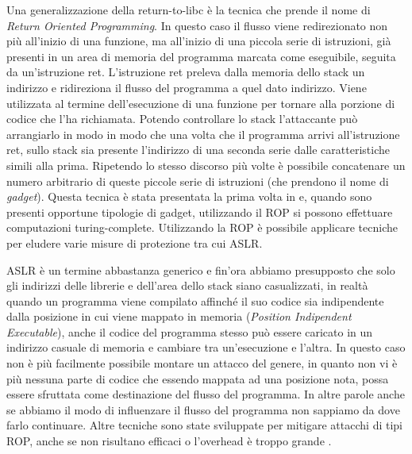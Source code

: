Una generalizzazione della return-to-libc è la tecnica che prende il
nome di \emph{Return Oriented
  Programming}\cite{Shacham-2007,Roemer-2012}. In questo caso il
flusso viene redirezionato non più all'inizio di una funzione, ma
all'inizio di una piccola serie di istruzioni, già presenti in un area
di memoria del programma marcata come eseguibile, seguita da
un'istruzione ret. L'istruzione ret preleva dalla memoria dello stack
un indirizzo e ridireziona il flusso del programma a quel dato
indirizzo. Viene utilizzata al termine dell'esecuzione di una funzione
per tornare alla porzione di codice che l'ha richiamata. Potendo
controllare lo stack l'attaccante può arrangiarlo in modo in modo che
una volta che il programma arrivi all'istruzione ret, sullo stack sia
presente l'indirizzo di una seconda serie dalle caratteristiche simili
alla prima. Ripetendo lo stesso discorso più volte è possibile
concatenare un numero arbitrario di queste piccole serie di istruzioni
(che prendono il nome di \emph{gadget}). Questa tecnica è stata
presentata la prima volta in \cite{Shacham-2007} e, quando sono
presenti opportune tipologie di gadget, utilizzando il ROP si possono
effettuare computazioni turing-complete. Utilizzando la ROP è
possibile applicare tecniche per eludere varie misure di protezione
\cite{roglia:2009} tra cui ASLR.

ASLR è un termine abbastanza generico e fin'ora abbiamo presupposto
che solo gli indirizzi delle librerie e dell'area dello stack siano
casualizzati, in realtà quando un programma viene compilato affinché
il suo codice sia indipendente dalla posizione in cui viene mappato in
memoria (\emph{Position Indipendent Executable}), anche il codice del
programma stesso può essere caricato in un indirizzo casuale di
memoria e cambiare tra un'esecuzione e l'altra. In questo caso non è
più facilmente possibile montare un attacco del genere, in quanto non
vi è più nessuna parte di codice che essendo mappata ad una posizione
nota, possa essere sfruttata come destinazione del flusso del
programma. In altre parole anche se abbiamo il modo di influenzare il
flusso del programma non sappiamo da dove farlo continuare. Altre
tecniche sono state sviluppate per mitigare attacchi di tipi ROP,
anche se non risultano efficaci o l'overhead è troppo grande
\cite{Davi-2014}.


